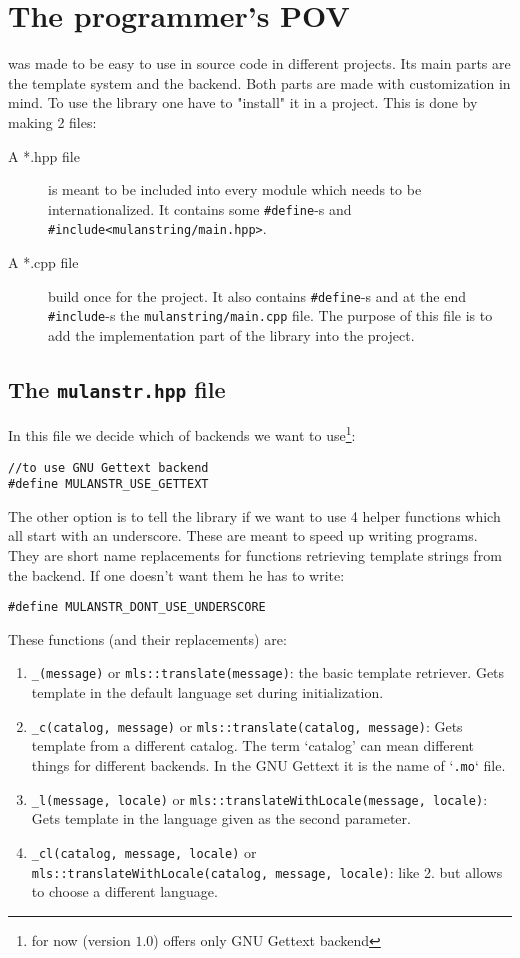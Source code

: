 \section{The programmer's POV}

\mulan{} was made to be easy to use in source code in different projects. Its main parts are the template system and the backend. 
Both parts are made with customization in mind. To use the library one have to "install" it in a project. This is done by making 2 files:
\begin{description}
	\item[A *.hpp file] is meant to be included into every module which needs to be internationalized. 
	It contains some \verb+#define+-s and \verb+#include<mulanstring/main.hpp>+.
	\item[A *.cpp file] build once for the project. It also contains \verb+#define+-s and at the end \verb+#include+-s the \verb+mulanstring/main.cpp+ file. 
	The purpose of this file is to add the implementation part of the \mulan{} library into the project.
\end{description}

\subsection{The \texttt{mulanstr.hpp} file}\label{headerFile}
In this file we decide which of backends we want to use\footnote{for now (version $1.0$) \mulan{} offers only GNU Gettext backend}:
\begin{verbatim}
//to use GNU Gettext backend
#define MULANSTR_USE_GETTEXT
\end{verbatim}

The other option is to tell the library if we want to use 4 helper functions which all start with an underscore.
These are meant to speed up writing programs. They are short name replacements for functions retrieving template strings from the backend.
If one doesn't want them he has to write:
\begin{verbatim}
#define MULANSTR_DONT_USE_UNDERSCORE
\end{verbatim}

These functions (and their replacements) are:
\begin{enumerate}
	\item \texttt{\_(message)} or \texttt{mls::translate(message)}: the basic template retriever. Gets template in the default language set during initialization.
	\item \texttt{\_c(catalog, message)} or \texttt{mls::translate(catalog, message)}: Gets template from a different catalog. 
	The term `catalog' can mean different things for different backends. In the GNU Gettext it is the name of `\texttt{.mo}` file.
	\item \texttt{\_l(message, locale)} or \texttt{mls::translateWithLocale(message, locale)}: Gets template in the language given as the second parameter. 
	\item \texttt{\_cl(catalog, message, locale)} or\\ \texttt{mls::translateWithLocale(}\texttt{catalog, message, locale)}: like 2. but allows to choose a different language.
\end{enumerate}

